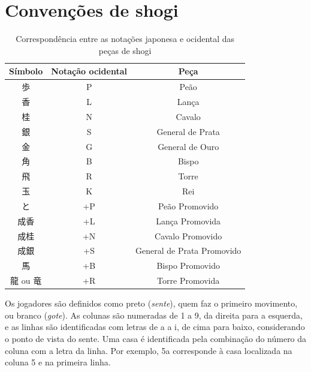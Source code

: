 \section{Convenções de shogi}
\begin{table}[H]
	\centering
	\caption{Correspondência entre as notações japonesa e ocidental das peças de shogi}
	\label{tab:shogi_pieces}
	\begin{tabular}{c c c}
		\toprule
		\textbf{Símbolo} & \textbf{Notação ocidental} & \textbf{Peça} \\
		\midrule
		歩 & P & Peão \\
		香 & L  & Lança \\
		桂 & N  & Cavalo \\
		銀 & S  & General de Prata \\
		金 & G  & General de Ouro \\
		角 & B  & Bispo \\
		飛 & R  & Torre \\
		玉 & K  & Rei \\
		と & +P  & Peão Promovido \\
		成香 & +L  & Lança Promovida \\
		成桂 & +N  & Cavalo Promovido \\
		成銀 & +S  & General de Prata Promovido \\
		馬 & +B  & Bispo Promovido \\
		龍 ou 竜 & +R  & Torre Promovida \\
		\bottomrule
	\end{tabular}
\end{table}
	Os jogadores são definidos como preto (\textit{sente}), quem faz o primeiro movimento, ou branco (\textit{gote}).
	As colunas são numeradas de 1 a 9, da direita para a esquerda, e as linhas são identificadas com letras de a a i, 
	de cima para baixo, considerando o ponto de vista do sente.
	Uma casa é identificada pela combinação do número da coluna com a letra da linha. Por exemplo, 5a corresponde à casa 
	localizada na coluna 5 e na primeira linha.

